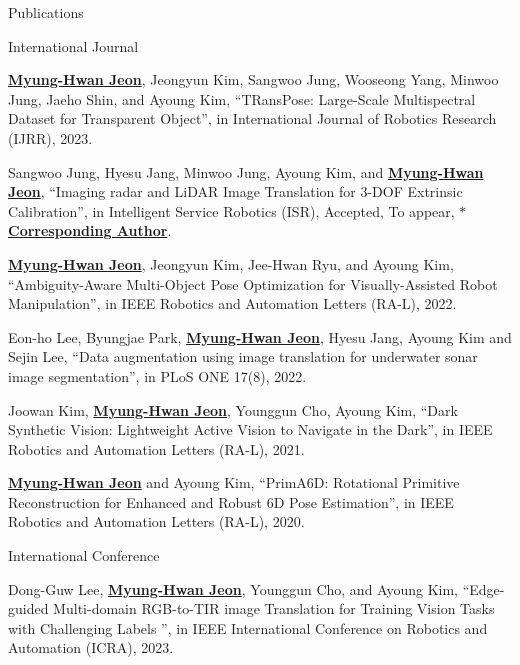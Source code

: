 \begin{rSection}{Publications}



\begin{pubSubsection}{International Journal}

  \item \underline{\textbf{Myung-Hwan Jeon}}, Jeongyun Kim, Sangwoo Jung, Wooseong Yang, Minwoo Jung, Jaeho Shin, and Ayoung Kim, “TRansPose: Large-Scale Multispectral Dataset for Transparent Object”, in International Journal of Robotics Research (IJRR), 2023.

  \item Sangwoo Jung, Hyesu Jang, Minwoo Jung, Ayoung Kim, and \underline{\textbf{Myung-Hwan Jeon}}, “Imaging radar and LiDAR Image Translation for 3-DOF Extrinsic Calibration”, in Intelligent Service Robotics (ISR), Accepted, To appear, \underline{\textbf{$\ast$Corresponding Author}}.

  \item \underline{\textbf{Myung-Hwan Jeon}}, Jeongyun Kim, Jee-Hwan Ryu, and Ayoung Kim, “Ambiguity-Aware Multi-Object Pose Optimization for Visually-Assisted Robot Manipulation”, in IEEE Robotics and Automation Letters (RA-L), 2022.
  
  \item Eon-ho Lee, Byungjae Park, \underline{\textbf{Myung-Hwan Jeon}}, Hyesu Jang, Ayoung Kim and Sejin Lee, “Data augmentation using image translation for underwater sonar image segmentation”, in PLoS ONE 17(8), 2022.
  
  \item Joowan Kim, \underline{\textbf{Myung-Hwan Jeon}}, Younggun Cho, Ayoung Kim, “Dark Synthetic Vision: Lightweight Active Vision to Navigate in the Dark”, in IEEE Robotics and Automation Letters (RA-L), 2021.
  
  \item \underline{\textbf{Myung-Hwan Jeon}} and Ayoung Kim, “PrimA6D: Rotational Primitive Reconstruction for Enhanced and Robust 6D Pose Estimation”, in IEEE Robotics and Automation Letters (RA-L), 2020.  

\end{pubSubsection}

\begin{pubSubsection}{International Conference}


  \item Dong-Guw Lee, \underline{\textbf{Myung-Hwan Jeon}}, Younggun Cho, and Ayoung Kim, “Edge-guided Multi-domain RGB-to-TIR image Translation for Training Vision Tasks with Challenging Labels ”, in IEEE International Conference on Robotics and Automation (ICRA), 2023.


\end{pubSubsection}
\end{rSection}
